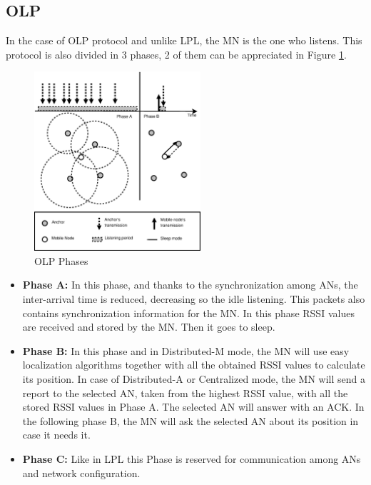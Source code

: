 \subsection{\acl{OLP}}

In the case of \ac{OLP} protocol and unlike \ac{LPL}, the \ac{MN} is the one who listens. This protocol is also divided in 3 phases, 2 of 
them can be appreciated in Figure \ref{fig:OLP}.

\begin{figure}[ht]
 \begin{center}
  \includegraphics[width=0.55\textwidth]{OLP.eps}
 \end{center}
 \caption{OLP Phases \cite{LPLandOLP}}
 \label{fig:OLP}
\end{figure}

\begin{itemize}
 \item \textbf{Phase A:} In this phase, and thanks to the synchronization among \acp{AN}, the inter-arrival time is reduced, decreasing so the
idle listening. This packets also contains synchronization information for the \ac{MN}. In this phase \ac{RSSI} values are received and stored
by the \ac{MN}. Then it goes to sleep.
 \item \textbf{Phase B:} In this phase and in Distributed-M mode, the \ac{MN} will use easy localization algorithms together with all the obtained
\ac{RSSI} values to calculate its position. In case of Distributed-A or Centralized mode, the \ac{MN} will send a report to the selected \ac{AN}, taken 
from the highest \ac{RSSI} value, with all the stored \ac{RSSI} values in Phase A. The selected \ac{AN} will answer with an \ac{ACK}. In the following
phase B, the \ac{MN} will ask the selected \ac{AN} about its position in case it needs it.
 \item \textbf{Phase C:} Like in \ac{LPL} this Phase is reserved for communication among \acp{AN} and network configuration.
\end{itemize}

